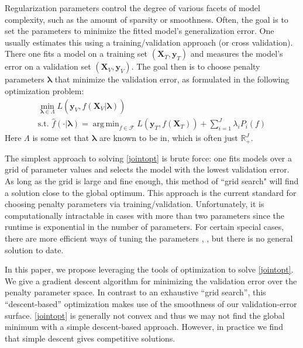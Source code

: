 \documentclass[12pt,letterpaper]{article}
\DeclareMathOperator*{\argmin}{arg\,min}
\begin{document}
Regularization parameters control the degree of various facets of model complexity, such as the amount of sparsity or smoothness. Often, the goal is to set the parameters to minimize the fitted model's generalization error. One usually estimates this using a training/validation approach (or cross validation). There one fits a model on a training set $(\boldsymbol X_T, \boldsymbol y_T)$ and measures the model's error on a validation set $(\boldsymbol X_V, \boldsymbol y_V)$. The goal then is to choose penalty parameters $\boldsymbol{\lambda}$ that minimize the validation error, as formulated in the following optimization problem:
\begin{equation}
\begin{array}{c}
\min_{\boldsymbol{\lambda} \in \Lambda} L\left (\boldsymbol{y}_V, \hat f (\boldsymbol{X}_V | \boldsymbol{\lambda}) \right) \\
\text{s.t. } \hat f(\cdot | \boldsymbol{\lambda}) = \argmin_{f\in\mathcal{F}} L \left (\boldsymbol{y}_T, f (\boldsymbol{X}_T) \right) + \sum\limits_{i=1}^J \lambda_i P_i(f)
\end{array}
\label{jointopt}
\end{equation}
Here $\Lambda$ is some set that $\boldsymbol{\lambda}$ are known to be in, which is often just $\mathbb{R}^{J}_+$.

The simplest approach to solving \eqref{jointopt} is brute force: one fits models over a grid of parameter values and selects the model with the lowest validation error. As long as the grid is large and fine enough, this method of ``grid search" will find a solution close to the global optimum. This approach is the current standard for choosing penalty parameters via training/validation. Unfortunately, it is computationally intractable in cases with more than two parameters since the runtime is exponential in the number of parameters. For certain special cases, there are more efficient ways of tuning the parameters \citep{golub1979generalized}, \citep{wood2000modelling}, but there is no general solution to date.

In this paper, we propose leveraging the tools of optimization to solve \eqref{jointopt}. We give a gradient descent algorithm for minimizing the validation error over the penalty parameter space. In contrast to an exhaustive ``grid search'', this ``descent-based'' optimization makes use of the smoothness of our validation-error surface. \eqref{jointopt} is generally not convex and thus we may not find the global minimum with a simple descent-based approach. However, in practice we find that simple descent gives competitive solutions.
\end{document}
